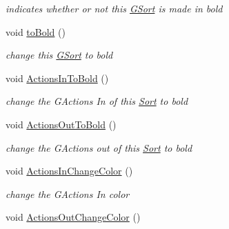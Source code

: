 \begin{DoxyCompactItemize}
\begin{DoxyCompactList}\small\item\em indicates whether or not this \hyperlink{classGSort}{G\+Sort} is made in bold \end{DoxyCompactList}\item 
\hypertarget{classGSort_a949ab093cfc0c732777eb086eab4f14d}{void \hyperlink{classGSort_a949ab093cfc0c732777eb086eab4f14d}{to\+Bold} ()}\label{classGSort_a949ab093cfc0c732777eb086eab4f14d}

\begin{DoxyCompactList}\small\item\em change this \hyperlink{classGSort}{G\+Sort} to bold \end{DoxyCompactList}\item 
\hypertarget{classGSort_a2b6ddd556e6314b3a5be157c41be2c05}{void \hyperlink{classGSort_a2b6ddd556e6314b3a5be157c41be2c05}{Actions\+In\+To\+Bold} ()}\label{classGSort_a2b6ddd556e6314b3a5be157c41be2c05}

\begin{DoxyCompactList}\small\item\em change the G\+Actions In of this \hyperlink{classSort}{Sort} to bold \end{DoxyCompactList}\item 
\hypertarget{classGSort_ae09c5f8af47355ef2328e28fa4d4e834}{void \hyperlink{classGSort_ae09c5f8af47355ef2328e28fa4d4e834}{Actions\+Out\+To\+Bold} ()}\label{classGSort_ae09c5f8af47355ef2328e28fa4d4e834}

\begin{DoxyCompactList}\small\item\em change the G\+Actions out of this \hyperlink{classSort}{Sort} to bold \end{DoxyCompactList}\item 
\hypertarget{classGSort_a6db06cbba4b129e8dc437f26782ae6a1}{void \hyperlink{classGSort_a6db06cbba4b129e8dc437f26782ae6a1}{Actions\+In\+Change\+Color} ()}\label{classGSort_a6db06cbba4b129e8dc437f26782ae6a1}

\begin{DoxyCompactList}\small\item\em change the G\+Actions In color \end{DoxyCompactList}\item 
\hypertarget{classGSort_a6a8db6207e236cef662c54b7432f7aca}{void \hyperlink{classGSort_a6a8db6207e236cef662c54b7432f7aca}{Actions\+Out\+Change\+Color} ()}\label{classGSort_a6a8db6207e236cef662c54b7432f7aca}


\end{DoxyCompactItemize}
